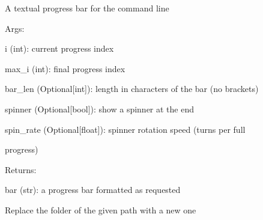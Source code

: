 \documentclass[letterpaper,10pt,english]{sphinxmanual}
\begin{document}
\begin{fulllineitems}
\label{doctree/soprano.utils:soprano.utils.progbar}
A textual progress bar for the command line

\begin{DUlineblock}{0em}
\item[] Args:
\item[]
\begin{DUlineblock}{\DUlineblockindent}
\item[] i (int): current progress index
\item[] max\_i (int): final progress index
\item[] bar\_len (Optional{[}int{]}): length in characters of the bar (no brackets)
\item[] spinner (Optional{[}bool{]}): show a spinner at the end
\item[] spin\_rate (Optional{[}float{]}): spinner rotation speed (turns per full
\item[]
\begin{DUlineblock}{\DUlineblockindent}
\item[] progress)
\end{DUlineblock}
\end{DUlineblock}
\end{DUlineblock}

\begin{DUlineblock}{0em}
\item[] Returns:
\item[]
\begin{DUlineblock}{\DUlineblockindent}
\item[] bar (str): a progress bar formatted as requested
\end{DUlineblock}
\end{DUlineblock}

\end{fulllineitems}


\begin{fulllineitems}
\label{doctree/soprano.utils:soprano.utils.replace_folder}
Replace the folder of the given path with a new one

\end{fulllineitems}
\end{document}
